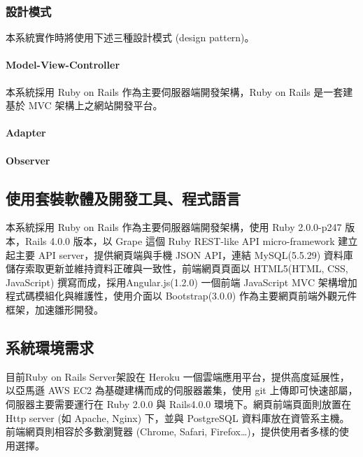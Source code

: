 \documentclass[11pt]{article}
\begin{document}
\subsubsection{設計模式}

本系統實作時將使用下述三種設計模式 (design pattern)。

\paragraph{Model-View-Controller}

本系統採用 Ruby on Rails 作為主要伺服器端開發架構，Ruby on Rails 是一套建基於 MVC 架構上之網站開發平台。

\paragraph{Adapter}

\paragraph{Observer}



\subsection{使用套裝軟體及開發工具、程式語言}
本系統採用 Ruby on Rails 作為主要伺服器端開發架構，使用 Ruby 2.0.0-p247 版本，Rails 4.0.0 版本，以 Grape 這個 Ruby REST-like API micro-framework 建立起主要 API server，提供網頁端與手機 JSON API，連結 MySQL(5.5.29) 資料庫儲存索取更新並維持資料正確與一致性，前端網頁頁面以 HTML5(HTML, CSS, JavaScript) 撰寫而成，採用Angular.js(1.2.0) 一個前端 JavaScript MVC 架構增加程式碼模組化與維護性，使用介面以 Bootstrap(3.0.0) 作為主要網頁前端外觀元件框架，加速雛形開發。
\subsection{系統環境需求}
目前Ruby on Rails Server架設在 Heroku 一個雲端應用平台，提供高度延展性，以亞馬遜 AWS EC2 為基礎建構而成的伺服器叢集，使用 git 上傳即可快速部屬，伺服器主要需要運行在 Ruby 2.0.0 與 Rails4.0.0 環境下。網頁前端頁面則放置在 Http server (如 Apache, Nginx) 下，並與 PostgreSQL 資料庫放在資管系主機。前端網頁則相容於多數瀏覽器 (Chrome, Safari, Firefox…)，提供使用者多樣的使用選擇。
\end{document}
